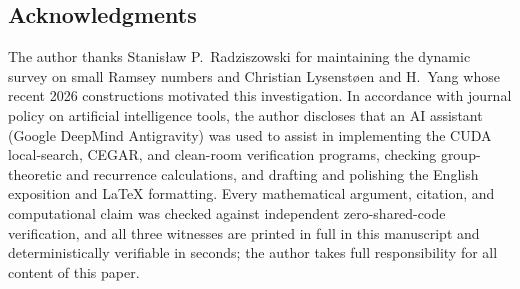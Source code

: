 \documentclass[11pt]{article}
\theoremstyle{remark}
\begin{document}
\subsection*{Acknowledgments}
The author thanks Stanis{\l}aw P.\ Radziszowski for maintaining the dynamic
survey on small Ramsey numbers and Christian Lysenst{\o}en and H.\ Yang whose
recent 2026 constructions motivated this investigation. In accordance with
journal policy on artificial intelligence tools, the author discloses that an AI
assistant (Google DeepMind Antigravity) was used to assist in implementing the
CUDA local-search, CEGAR, and clean-room verification programs, checking
group-theoretic and recurrence calculations, and drafting and polishing the
English exposition and \LaTeX{} formatting. Every mathematical argument,
citation, and computational claim was checked against independent zero-shared-code
verification, and all three witnesses are printed in full in this manuscript and
deterministically verifiable in seconds; the author takes full responsibility
for all content of this paper.
\end{document}
